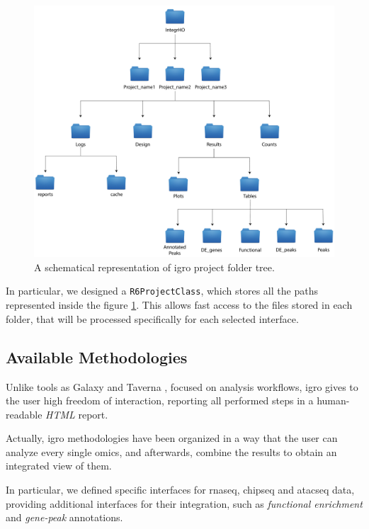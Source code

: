 \begin{figure}[H]
\centering
\includegraphics[width=\textwidth, keepaspectratio]{img/integrho/project_folder.pdf}
\caption[\gls{igro} folder tree]{A schematical representation of \gls{igro} project folder tree.}
\label{fig:integrhotree}
\end{figure}

In particular, we designed a \lstinline!R6ProjectClass!, which stores all the paths represented inside the figure \ref{fig:integrhotree}.
This allows fast access to the files stored in each folder, that will be processed specifically for each selected interface.


\subsection{Available Methodologies}

Unlike tools as Galaxy \cite{Hillman-Jackson2012} and Taverna \cite{Wolstencroft2013}, focused on analysis workflows, \gls{igro} gives to the user high freedom of interaction, reporting all performed steps in a human-readable \textit{HTML} report.
 
Actually, \gls{igro} methodologies have been organized in a way that the user can analyze every single omics, and afterwards, combine the results to obtain an integrated view of them.

In particular, we defined specific interfaces for \gls{rnaseq}, \gls{chipseq} and \gls{atacseq} data, providing additional interfaces for their integration, such as \textit{functional enrichment} and \textit{gene-peak} annotations.

